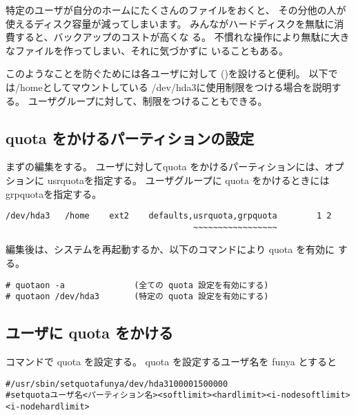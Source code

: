 \documentclass{jreport}
\begin{document}
特定のユーザが自分のホームにたくさんのファイルをおくと、
その分他の人が使えるディスク容量が減ってしまいます。
みんながハードディスクを無駄に消費すると、バックアップのコストが高くな
る。
不慣れな操作により無駄に大きなファイルを作ってしまい、それに気づかずに
いることもある。

このようなことを防ぐためには各ユーザに対して
()を設けると便利。
以下では{\ttfamily /home}としてマウントしている
{\ttfamily /dev/hda3}に使用制限をつける場合を説明する。
ユーザグループに対して、制限をつけることもできる。

\subsection{quota をかけるパーティションの設定}
まずの編集をする。
ユーザに対してquota をかけるパーティションには、オプションに
{\ttfamily usrquota}を指定する。
ユーザグループに quota をかけるときには{\ttfamily grpquota}を指定する。
\begin{screen}
\begin{verbatim}
/dev/hda3   /home    ext2    defaults,usrquota,grpquota        1 2
                                      ~~~~~~~~~~~~~~~~~
\end{verbatim}
\end{screen}

編集後は、システムを再起動するか、以下のコマンドにより quota を有効に
する。
\begin{screen}
\begin{verbatim}
# quotaon -a              (全ての quota 設定を有効にする)
# quotaon /dev/hda3       (特定の quota 設定を有効にする)
\end{verbatim}
\end{screen}


\subsection{ユーザに quota をかける}
 コマンドで quota を設定する。
quota を設定するユーザ名を funya とすると
\begin{screen}
\begin{alltt}
# /usr/sbin/setquota funya /dev/hda3 10000 15000 0 0
{\scriptsize# setquota ユーザ名  <パーティション名> <softlimit> <hardlimit> <i-node soft limit> <i-node hard limit>}
\end{alltt}
\end{screen}
\end{document}
